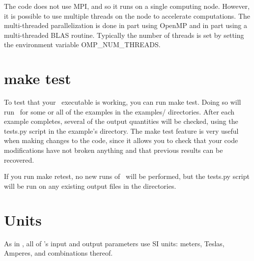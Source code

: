 The code does not use {\ttfamily MPI}, and so it runs on a single computing node.  However, it is possible to use multiple threads
on the node to accelerate computations.  The multi-threaded parallelization is done in part using {\ttfamily OpenMP}
and in part using a multi-threaded {\ttfamily BLAS} routine. Typically the number of threads is set by
setting the environment variable {\ttfamily OMP\_NUM\_THREADS}.


\section{\ttfamily make test}

To test that your \regcoil~executable is working, you can run {\ttfamily make test}.  Doing so will run
\regcoil~for some or all of the examples in the {\ttfamily examples/} directories.
After each example completes, several of the output quantities
will be checked, using the
{\ttfamily tests.py} script in the example's directory.
The {\ttfamily make test} feature is very useful when making changes to the code, since it allows you to check
that your code modifications have not broken anything and that previous results
can be recovered.

If you run {\ttfamily make retest},
no new runs of \regcoil~will be performed, but the {\ttfamily tests.py} script
will be run on any existing output files in the  directories.

\section{Units}

As in \vmec, all of \regcoil's input and output parameters use SI units: meters, Teslas, Amperes, and combinations thereof.

